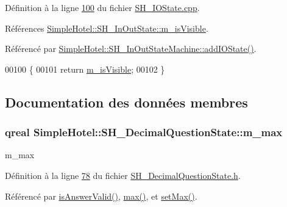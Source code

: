 Définition à la ligne \hyperlink{SH__IOState_8cpp_source_l00100}{100} du fichier \hyperlink{SH__IOState_8cpp_source}{S\-H\-\_\-\-I\-O\-State.\-cpp}.



Références \hyperlink{classSimpleHotel_1_1SH__InOutState_a041ad53f3cdfb1b18ee002597e833848}{Simple\-Hotel\-::\-S\-H\-\_\-\-In\-Out\-State\-::m\-\_\-is\-Visible}.



Référencé par \hyperlink{classSimpleHotel_1_1SH__InOutStateMachine_a07ae9f1f74a9a41b26e77a014679a33e}{Simple\-Hotel\-::\-S\-H\-\_\-\-In\-Out\-State\-Machine\-::add\-I\-O\-State()}.


\begin{DoxyCode}
00100                                \{
00101     \textcolor{keywordflow}{return} \hyperlink{classSimpleHotel_1_1SH__InOutState_a041ad53f3cdfb1b18ee002597e833848}{m\_isVisible};
00102 \}
\end{DoxyCode}


\subsection{Documentation des données membres}
\hypertarget{classSimpleHotel_1_1SH__DecimalQuestionState_a8bc449bf4ea6dd8d2e9b335a486b72bb}{
\subsubsection[{m\-\_\-max}]{\setlength{\rightskip}{0pt plus 5cm}qreal Simple\-Hotel\-::\-S\-H\-\_\-\-Decimal\-Question\-State\-::m\-\_\-max\hspace{0.3cm}{\ttfamily [private]}}}\label{classSimpleHotel_1_1SH__DecimalQuestionState_a8bc449bf4ea6dd8d2e9b335a486b72bb}


m\-\_\-max 



Définition à la ligne \hyperlink{SH__DecimalQuestionState_8h_source_l00078}{78} du fichier \hyperlink{SH__DecimalQuestionState_8h_source}{S\-H\-\_\-\-Decimal\-Question\-State.\-h}.



Référencé par \hyperlink{classSimpleHotel_1_1SH__DecimalQuestionState_a1693d6f6026fcc17866c9c90e235bd64}{is\-Answer\-Valid()}, \hyperlink{classSimpleHotel_1_1SH__DecimalQuestionState_af97491a4d3adbc9bee96c4cc8aefeb99}{max()}, et \hyperlink{classSimpleHotel_1_1SH__DecimalQuestionState_af1ba1d4492697d7956862e2842bb5b43}{set\-Max()}.

